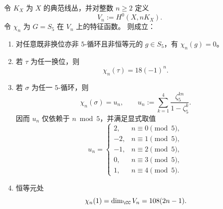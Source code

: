 \begin{theorem}[多重典范表示的三支撑特征函数与周期性]\label{thm:xi-terminal-zm-delta-s5-pluricanonical-character-support}
令 \(K_X\) 为 \(X\) 的典范线丛，并对整数 \(n\ge 2\) 定义
\[
V_n:=H^0(X,nK_X).
\]
令 \(\chi_n\) 为 \(G=S_5\) 在 \(V_n\) 上的特征函数。
则成立：
\begin{enumerate}
  \item 对任意既非换位亦非 \(5\)-循环且非恒等元的 \(g\in S_5\)，有 \(\chi_n(g)=0\)。
  \item 若 \(\tau\) 为任一换位，则
  \[
  \chi_n(\tau)=18(-1)^n.
  \]
  \item 若 \(\sigma\) 为任一 \(5\)-循环，则
  \[
  \chi_n(\sigma)=u_n,
  \qquad
  u_n:=\sum_{k=1}^4\frac{\zeta_5^{kn}}{1-\zeta_5^{k}}.
  \]
  因而 \(u_n\) 仅依赖于 \(n\bmod 5\)，并满足显式取值
  \[
  u_n=
  \begin{cases}
  2,&n\equiv 0\pmod 5,\\
  -2,&n\equiv 1\pmod 5,\\
  -1,&n\equiv 2\pmod 5,\\
  0,&n\equiv 3\pmod 5,\\
  1,&n\equiv 4\pmod 5.
  \end{cases}
  \]
  \item 恒等元处
  \[
  \chi_n(1)=\dim_\CC V_n=108(2n-1).
  \]
\end{enumerate}
\end{theorem}
